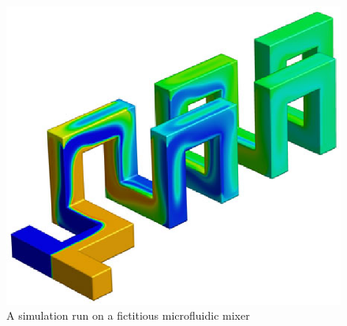 \documentclass[12pt]{article}
\begin{document}
\begin{figure}[htcb]
\begin{center}
	\includegraphics{mixer.eps}
	\caption{A simulation run on a fictitious microfluidic mixer~\cite{TECPLOT}}
	\label{fig:mixer_sim}
\end{center}
\end{figure}
\end{document}
